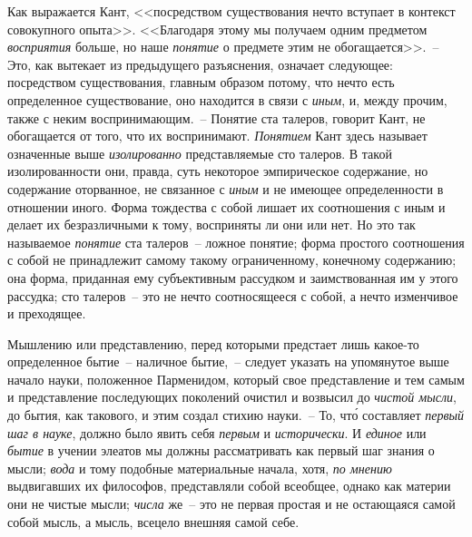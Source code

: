 Как выражается Кант, <<посредством существования
нечто вступает в контекст совокупного опыта>>. <<Благодаря
этому мы получаем одним предметом \emph{восприятия}
больше, но наше \emph{понятие} о предмете этим не обогащается>>\endnotemark{}.~--
Это, как вытекает из предыдущего разъяснения,
означает следующее: посредством существования, главным
образом потому, что нечто есть определенное существование,
оно находится в связи с \emph{иным}, и, между
прочим, также с неким воспринимающим.~-- Понятие ста
талеров, говорит Кант, не обогащается от того, что их
воспринимают. \emph{Понятием} Кант здесь называет означенные
выше \emph{изолированно} представляемые сто талеров.
В такой изолированности они, правда, суть некоторое
эмпирическое содержание, но содержание оторванное, не
связанное с \emph{иным} и не имеющее определенности в отношении
иного. Форма тождества с собой лишает их соотношения
с иным и делает их безразличными к тому,
восприняты ли они или нет. Но это так называемое \emph{понятие}
ста талеров~-- ложное понятие; форма простого
соотношения с собой не принадлежит самому такому
ограниченному, конечному содержанию; она форма, приданная
ему субъективным рассудком и заимствованная
им у этого рассудка; сто талеров~-- это не нечто соотносящееся
с собой, а нечто изменчивое и преходящее.


Мышлению или представлению, перед которыми предстает
лишь какое-то определенное бытие~-- наличное бытие,~--
следует указать на упомянутое выше начало
науки, положенное Парменидом, который свое представление
и тем самым и представление последующих поколений
очистил и возвысил до \emph{чистой мысли}, до бытия,
как такового, и этим создал стихию науки.~-- То, чт\'о
составляет \emph{первый шаг в науке}, должно было явить себя
\emph{первым} и \emph{исторически}. И \emph{единое} или \emph{бытие} в учении
элеатов мы должны рассматривать как первый шаг знания
о мысли; \emph{вода} и тому подобные материальные начала,
хотя, \emph{по мнению} выдвигавших их философов, представляли
собой всеобщее, однако как материи они не чистые
мысли; \emph{числа}
же~-- это не первая простая и не
остающаяся самой собой мысль, а мысль, всецело внешняя
самой себе.


